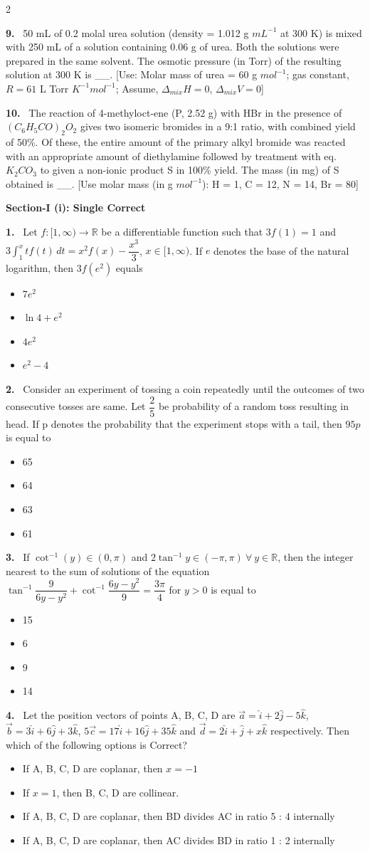 \documentclass[10pt]{extarticle}
\newcommand{\partsec}[2]{\par\medskip\noindent{\large\bfseries PART-#1: #2}\par\smallskip}
\newcommand{\sect}[1]{\par\smallskip\noindent\textbf{#1}\par}
\newcommand{\qn}[1]{\par\smallskip\noindent\textbf{#1.}~}
\newenvironment{qoptions}{\begin{itemize}[leftmargin=1.8em,itemsep=1pt,topsep=2pt,label={}]}{\end{itemize}}
\newcommand{\opt}[2]{\item[(#1)] #2}
\begin{document}
\begin{multicols}{2}
\qn{9} 50 mL of 0.2 molal urea solution (density = 1.012 g $mL^{-1}$ at 300 K) is mixed with 250 mL of a solution containing 0.06 g of urea. Both the solutions were prepared in the same solvent. The osmotic pressure (in Torr) of the resulting solution at 300 K is \_\_. [Use: Molar mass of urea = 60 g $mol^{-1}$; gas constant, $R=61$ L Torr $K^{-1}mol^{-1}$; Assume, $\Delta_{mix}H=0$, $\Delta_{mix}V=0$]

\qn{10} The reaction of 4-methyloct-ene (P, 2.52 g) with HBr in the presence of $(C_6H_5CO)_2O_2$ gives two isomeric bromides in a 9:1 ratio, with combined yield of 50\%. Of these, the entire amount of the primary alkyl bromide was reacted with an appropriate amount of diethylamine followed by treatment with eq. $K_2CO_3$ to given a non-ionic product S in 100\% yield. The mass (in mg) of S obtained is \_\_. [Use molar mass (in g $mol^{-1}$): H = 1, C = 12, N = 14, Br = 80]

\partsec{3}{MATHEMATICS}

\sect{Section-I (i): Single Correct}

\qn{1} Let $f:[1,\infty)\to\mathbb R$ be a differentiable function such that $3f(1)=1$ and $3\displaystyle\int_1^x tf(t)\,dt = x^2f(x)-\dfrac{x^3}{3}$, $x\in[1,\infty)$. If $e$ denotes the base of the natural logarithm, then $3f(e^2)$ equals
\begin{qoptions}
\opt{A}{$7e^2$}
\opt{B}{$\ln4+e^2$}
\opt{C}{$4e^2$}
\opt{D}{$e^2-4$}
\end{qoptions}

\qn{2} Consider an experiment of tossing a coin repeatedly until the outcomes of two consecutive tosses are same. Let $\dfrac25$ be probability of a random toss resulting in head. If p denotes the probability that the experiment stops with a tail, then $95p$ is equal to
\begin{qoptions}
\opt{A}{65}
\opt{B}{64}
\opt{C}{63}
\opt{D}{61}
\end{qoptions}

\qn{3} If $\cot^{-1}(y)\in(0,\pi)$ and $2\tan^{-1}y\in(-\pi,\pi)\ \forall\ y\in\mathbb R$, then the integer nearest to the sum of solutions of the equation $\tan^{-1}\dfrac{9}{6y-y^2}+\cot^{-1}\dfrac{6y-y^2}{9}=\dfrac{3\pi}{4}$ for $y>0$ is equal to
\begin{qoptions}
\opt{A}{15}
\opt{B}{6}
\opt{C}{9}
\opt{D}{14}
\end{qoptions}

\qn{4} Let the position vectors of points A, B, C, D are $\vec a=\hat i+2\hat j-5\hat k$, $\vec b=3\hat i+6\hat j+3\hat k$, $5\vec c=17\hat i+16\hat j+35\hat k$ and $\vec d=2\hat i+\hat j+x\hat k$ respectively. Then which of the following options is Correct?
\begin{qoptions}
\opt{A}{If A, B, C, D are coplanar, then $x=-1$}
\opt{B}{If $x=1$, then B, C, D are collinear.}
\opt{C}{If A, B, C, D are coplanar, then BD divides AC in ratio 5 : 4 internally}
\opt{D}{If A, B, C, D are coplanar, then AC divides BD in ratio 1 : 2 internally}
\end{qoptions}


\end{multicols}
\end{document}
